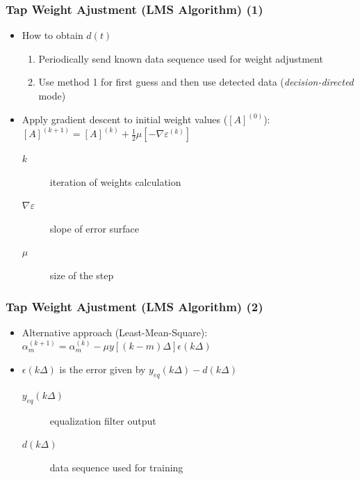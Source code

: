 \documentclass{beamer}
\begin{document}
\begin{frame}
	\frametitle{Tap Weight Ajustment (LMS Algorithm) (1)}
	\begin{itemize}
		\item How to obtain $ d(t) $
		\begin{enumerate}
			\item Periodically send known data sequence used for weight adjustment
			\item Use method 1 for first guess and then use detected data (\emph{decision-directed} mode)
		\end{enumerate}
		\item Apply gradient descent to initial weight values ($ [A]^{(0)} $): $ [A]^{(k+1)} = [A]^{(k)} + \frac{1}{2}\mu [-\nabla\varepsilon^{(k)}] $
		\begin{description}
			\item[$ k $] iteration of weights calculation
			\item[$ \nabla\varepsilon $] slope of error surface
			\item[$ \mu $] size of the step
		\end{description}
	\end{itemize}
\end{frame}

\begin{frame}
	\frametitle{Tap Weight Ajustment (LMS Algorithm) (2)}
	\begin{itemize}
		\item Alternative approach (Least-Mean-Square): $ \alpha^{(k+1)}_m = \alpha^{(k)}_m - \mu y[(k - m)\Delta] \epsilon(k\Delta) $
		\item $ \epsilon(k\Delta) $ is the error given by $ y_{eq}(k\Delta) - d(k\Delta) $
		\begin{description}
			\item[$ y_{eq}(k\Delta) $] equalization filter output
			\item[$ d(k\Delta) $] data sequence used for training
		\end{description}
	\end{itemize}
\end{frame}
\end{document}
